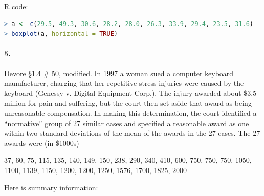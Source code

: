     \begin{mdframed}
        R code:

        \begin{adjustbox}{width=0.9\textwidth, keepaspectratio}
            \begin{lstlisting}[language=R]
> a <- c(29.5, 49.3, 30.6, 28.2, 28.0, 26.3, 33.9, 29.4, 23.5, 31.6)
> boxplot(a, horizontal = TRUE)
            \end{lstlisting}
        \end{adjustbox}
        \centering{}
    \end{mdframed}

    \paragraph*{5.}
    Devore \S1.4 \# 50, modified. In 1997 a woman sued a computer keyboard manufacturer, charging that her repetitive stress injuries were caused by the keyboard (Genessy v. Digital Equipment Corp.). The injury awarded about \$3.5 million for pain and suffering, but the court then set aside that award as being unreasonable compensation. In making this determination, the court identified a “normative” group of 27 similar cases and specified a reasonable award as one within two standard deviations of the mean of the awards in the 27 cases. The 27 awards were (in \$1000s) 
    
    37, 60, 75, 115, 135, 140, 149, 150, 238, 290, 340, 410, 600, 750, 750, 750, 1050, 1100, 1139, 1150, 1200, 1200, 1250, 1576, 1700, 1825, 2000

    Here is summary information:

